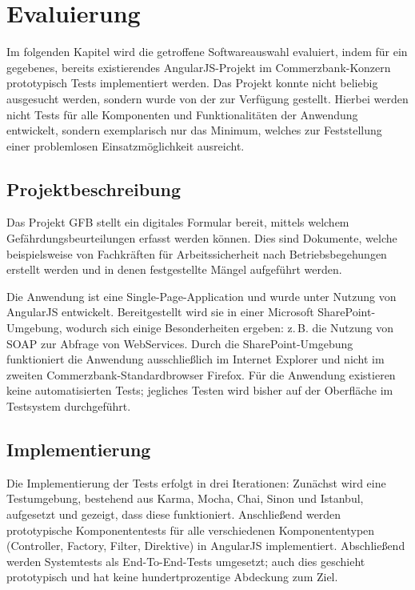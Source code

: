 \section{Evaluierung}
Im folgenden Kapitel wird die getroffene Softwareauswahl evaluiert, indem für ein gegebenes, bereits existierendes AngularJS-Projekt im Commerzbank-Konzern prototypisch Tests implementiert werden. Das Projekt konnte nicht beliebig ausgesucht werden, sondern wurde von der \domain zur Verfügung gestellt. Hierbei werden nicht Tests für alle Komponenten und Funktionalitäten der Anwendung entwickelt, sondern exemplarisch nur das Minimum, welches zur Feststellung einer problemlosen Einsatzmöglichkeit ausreicht.

\subsection{Projektbeschreibung}
Das Projekt GFB stellt ein digitales Formular bereit, mittels welchem Gefährdungsbeurteilungen erfasst werden können. Dies sind Dokumente, welche beispielsweise von Fachkräften für Arbeitssicherheit nach Betriebsbegehungen erstellt werden und in denen festgestellte Mängel aufgeführt werden. \cite{gfb}

Die Anwendung ist eine Single-Page-Application und wurde unter Nutzung von AngularJS entwickelt. Bereitgestellt wird sie in einer Microsoft SharePoint-Umgebung, wodurch sich einige Besonderheiten ergeben: z.\,B. die Nutzung von SOAP zur Abfrage von WebServices. Durch die SharePoint-Umgebung funktioniert die Anwendung ausschließlich im Internet Explorer und nicht im zweiten Commerzbank-Standardbrowser Firefox. Für die Anwendung existieren keine automatisierten Tests; jegliches Testen wird bisher auf der Oberfläche im Testsystem durchgeführt. \cite{gfb}

\subsection{Implementierung}
Die Implementierung der Tests erfolgt in drei Iterationen: Zunächst wird eine Testumgebung, bestehend aus Karma, Mocha, Chai, Sinon und Istanbul, aufgesetzt und gezeigt, dass diese funktioniert. Anschließend werden prototypische Komponententests für alle verschiedenen Komponententypen (Controller, Factory, Filter, Direktive) in AngularJS implementiert. Abschließend werden Systemtests als End-To-End-Tests umgesetzt; auch dies geschieht prototypisch und hat keine hundertprozentige Abdeckung zum Ziel.

